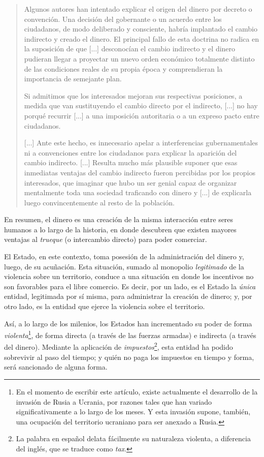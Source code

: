 \documentclass[12pt,a4paper]{article}
\begin{document}
\begin{quotation}
Algunos autores han intentado explicar el origen del dinero por decreto o convención. Una decisión del gobernante o un acuerdo entre los ciudadanos, de modo deliberado y consciente, habría implantado el cambio indirecto y creado el dinero. El principal fallo de esta doctrina no radica en la suposición de que [...] desconocían el cambio indirecto y el dinero pudieran llegar a proyectar un nuevo orden económico totalmente distinto de las condiciones reales de su propia época y comprendieran la importancia de semejante plan.

Si admitimos que los interesados mejoran sus respectivas posiciones, a medida que van sustituyendo el cambio directo por el indirecto, [...] no hay porqué recurrir [...] a una imposición autoritaria o a un expreso pacto entre ciudadanos.

[...] Ante este hecho, es innecesario apelar a interferencias gubernamentales ni a convenciones entre los ciudadanos para explicar la aparición del cambio indirecto. [...] Resulta mucho más plausible suponer que esas inmediatas ventajas del cambio indirecto fueron percibidas por los propios interesados, que imaginar que hubo un ser genial capaz de organizar mentalmente toda una sociedad traficando con dinero y [...] de explicarla luego convincentemente al resto de la población. \cite[pág. 488]{mises:lah}
\end{quotation}

En resumen, el dinero es una creación de la misma interacción entre seres humanos a lo largo de la historia, en donde descubren que existen mayores ventajas al \textit{trueque} (o intercambio directo) para poder comerciar.

El Estado, en este contexto, toma posesión de la administración del dinero y, luego, de su acuñación. Esta situación, sumado al monopolio \textit{legitimado} de la violencia sobre un territorio, conduce a una situación en donde los incentivos no son favorables para el libre comercio. Es decir, por un lado, es el Estado la \textit{única} entidad, legitimada por sí misma, para administrar la creación de dinero; y, por otro lado, es la entidad que ejerce la violencia sobre el territorio.

Así, a lo largo de los milenios, los Estados han incrementado su poder de forma \textit{violenta}\footnote{En el momento de escribir este artículo, existe actualmente el desarrollo de la invasión de Rusia a Ucrania, por razones tales que han variado significativamente a lo largo de los meses. Y esta invasión supone, también, una ocupación del territorio ucraniano para ser anexado a Rusia.}, de forma directa (a través de las fuerzas armadas) e indirecta (a través del dinero). Mediante la aplicación de \textit{impuestos}\footnote{La palabra en español delata fácilmente su naturaleza violenta, a diferencia del inglés, que se traduce como \textit{tax}.}, esta entidad ha podido sobrevivir al paso del tiempo; y quién no paga los impuestos en tiempo y forma, será sancionado de alguna forma.
\end{document}

